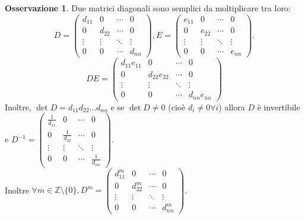 \documentclass[a4paper]{article}
\theoremstyle{definition}
\newtheorem*{oss}{Osservazione}
\begin{document}
	\begin{oss}
		Due matrici diagonali sono semplici da moltiplicare tra loro:
		\[
			D = \begin{pmatrix}
			d_{11} & 0 & \cdots & 0 \\
			0 & d_{22} & \cdots & 0 \\
			\vdots & \vdots & \ddots & \vdots \\
			0 & 0 & \cdots & d_{nn}
		\end{pmatrix}, E = \begin{pmatrix}
			e_{11} & 0 & \cdots & 0 \\
			0 & e_{22} & \cdots & 0 \\
			\vdots & \vdots & \ddots & \vdots \\
			0 & 0 & \cdots & e_{nn}
		\end{pmatrix}. \]
		\[ DE = \begin{pmatrix}
			d_{11}e_{11} & 0 & \cdots & 0 \\
			0 & d_{22}e_{22} & \cdots & 0 \\
			\vdots & \vdots & \ddots & \vdots \\
			0 & 0 & \cdots & d_{nn}e_{nn}
		\end{pmatrix} \]
		Inoltre, $\det D = d_{11}d_{22}...d_{nn}$ e se $\det D \ne 0$ (cioè $d_i \ne 0 \forall i$) allora $D$ è invertibile e $D^{-1} = \begin{pmatrix}
			\frac{1}{d_{11}} & 0 & \cdots & 0 \\
			0 & \frac{1}{d_{22}} & \cdots & 0 \\
			\vdots & \vdots & \ddots & \vdots \\
			0 & 0 & \cdots & \frac{1}{d_{nn}}
		\end{pmatrix}$. \\
		Inoltre $\forall m \in \mathbb{Z} \setminus \{0\}, D^m = \begin{pmatrix}
			d_{11}^m & 0 & \cdots & 0 \\
			0 & d_{22}^m & \cdots & 0 \\
			\vdots & \vdots & \ddots & \vdots \\
			0 & 0 & \cdots & d_{nn}^m
		\end{pmatrix}$.
	\end{oss}
\end{document}
